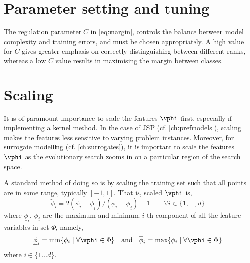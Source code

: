 \begin{comment}
\subsection{Kernel functions}
There are several choices for a kernel $\kappa$, e.g., \emph{polynomial kernel},
\begin{eqnarray}
\kappa_{\text{poly}}(\vec{x}_i,\vec{x}_j)&=& \left(1+\inner{\vec{x}_i}{\vec{x}_j} \right)^p
\end{eqnarray}
of order $p$, or the most commonly used kernel in the literature which implements a Gauss\-ian radial basis function, the \emph{rbf kernel},
\begin{eqnarray}
\kappa_{\text{rbf}}(\vec{x}_i,\vec{x}_j)&=& e^{-\gamma \norm{\vec{x}_i-\vec{x}_j}^2}
\end{eqnarray}
for $\gamma>0$.
\end{comment}

\section{Parameter setting and tuning}
The regulation parameter $C$ in \cref{eq:margin}, controls the balance between model complexity and training errors, and must be chosen appropriately. A high value for $C$ gives greater emphasis on correctly distinguishing between different ranks, whereas a low $C$ value results in maximising the margin between classes.

\section{Scaling}
It is of paramount importance to scale the features $\vphi$ first, especially if implementing a kernel method. 
In the case of JSP (cf. \cref{ch:prefmodels}), scaling makes the features less sensitive to varying problem instances.
Moreover, for surrogate modelling (cf. \cref{ch:surrogates}), it is important to scale the features $\vphi$ as the evolutionary search zooms in on a particular region of the search space. 

A standard method of doing so is by scaling the training set such that all points are in some range, typically $[-1,1]$. That is, scaled $\tilde{\vphi}$ is,
\begin{equation}\label{eq:scale}
\tilde{\phi}_i = 2 (\phi_i - \underline{\phi}_i) / (\overline{\phi}_i - \underline{\phi}_i) - 1 
\quad\quad \forall i\in\{1,\ldots,d\}
\end{equation}
where $\underline{\phi}_i$, $\overline{\phi}_i$ are the maximum and minimum $i$-th component of all the feature variables in set $\Phi$, namely,
\begin{equation}
\underline{\phi}_i=\min\{\phi_i\;|\;\forall\vphi\in \Phi\} \quad\textrm{and}\quad \overline{\phi}_i=\max\{\phi_i\;|\;\forall\vphi\in \Phi\}
\end{equation}
where $i\in\{1\ldots d\}$. 



